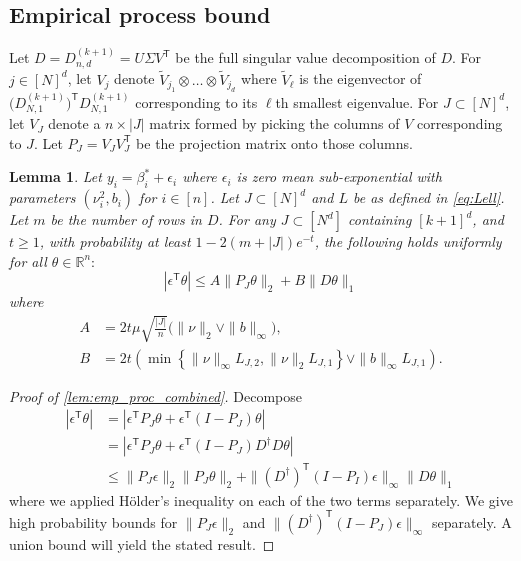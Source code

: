 \documentclass[ejs,noshowframe]{imsart}
\theoremstyle{plain}
\newtheorem{lemma}[theorem]{Lemma}
\theoremstyle{definition}
\newcommand{\R}{\mathbb{R}}
\renewcommand{\top}{\mathsf{T}}
\renewcommand{\tilde}{\widetilde}
\begin{document}
\begin{appendix}
\subsection{Empirical process bound}
Let $D = D^{(k+1)}_{n,d} = U \Sigma V^\top$ be the full singular value 
decomposition of $D$.
For $j\in [N]^d$, let $V_j$ denote $\tilde V_{j_1} \otimes  \dots \otimes \tilde V_{j_d}$ where
$\tilde V_{\ell}$ is the eigenvector of $ \big( D^{(k+1)}_{N,1} )^\top D^{(k+1)}_{N,1}$ 
corresponding to its $\ell$th smallest eigenvalue.
For $J \subset [N]^d$, let $V_J$ denote a $n \times |J|$ matrix formed by 
picking the columns of 
$V$ corresponding to $J$. 
Let $P_J = V_J V_J^\top$ be the projection matrix onto those columns.
\begin{lemma}
\label{lem:emp_proc_combined}
Let $y_i = \beta^*_i + \epsilon_i$ where $\epsilon_i$ is zero mean
sub-exponential with parameters $(\nu_i^2, b_i)$ for $i\in [n]$.  
Let $J \subset [N]^d$ and $L$ be as defined in \eqref{eq:Lell}.
Let $m$ be the number of rows in $D$.
For any $J \subset [N^d]$ containing $[k+1]^d$,
and $t\geq 1$,
with probability at least $1 - 2(m+|J|) e^{-t}$, the following holds uniformly 
for all $\theta \in \R^n:$
\begin{equation}
 |\epsilon^\top \theta| \leq  A \|P_{J} \theta\|_2 + B \| D \theta\|_1
\label{eq:emp_proc_bd_1}
\end{equation}
where 
\begin{align}
A &= 2t\mu \sqrt{\frac{|J|}{n}} \big( \| \nu \|_2 \vee \|b\|_\infty\big),\\
B &= 2t\left( 
	\min\left\{ \|\nu\|_\infty  L_{J,2}, 
					  \|\nu\|_2 L_{J,1} \right\}
	\vee  \| b \|_\infty L_{J,1}\right).
\end{align}
\end{lemma}
\begin{proof}[Proof of \autoref{lem:emp_proc_combined}]
Decompose
\begin{align}
|\epsilon^\top \theta|
&= 
|\epsilon^\top P_{J} \theta +
\epsilon^\top (I-P_{J}) \theta |\\
&= 
|\epsilon^\top P_{J} \theta +
\epsilon^\top (I-P_{J}) D^\dagger D \theta |\\
&\leq 
\| P_{J} \epsilon \|_2 \| P_{J} \theta \|_2 +
\| (D^\dagger)^\top (I-P_{I}) \epsilon\|_\infty \|D\theta\|_1
\end{align}
where we applied H\"older's inequality on each of the two terms separately.
We give high probability bounds for $\| P_{J} \epsilon \|_2$ and 
$\| (D^\dagger)^\top (I-P_{J}) \epsilon\|_\infty$ separately. A union bound 
will yield the stated  result.


\end{proof}
\end{appendix}
\end{document}
